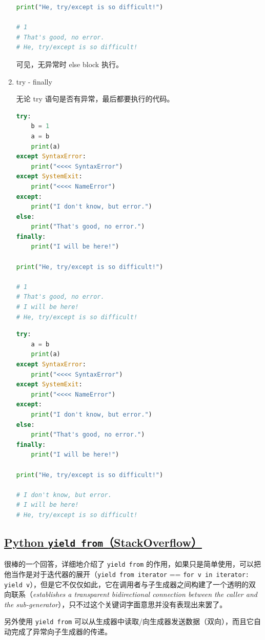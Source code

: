 \begin{enumerate}
\begin{lstlisting}[language=Python]
print("He, try/except is so difficult!")

# 1
# That's good, no error.
# He, try/except is so difficult!
\end{lstlisting}

可见，无异常时 else block 执行。

\item try - finally

无论 try 语句是否有异常，最后都要执行的代码。

\begin{lstlisting}[language=Python]
try:
	b = 1
	a = b
	print(a)
except SyntaxError:
	print("<<<< SyntaxError")
except SystemExit:
	print("<<<< NameError")
except:
	print("I don't know, but error.")
else:
	print("That's good, no error.")
finally:
	print("I will be here!")

print("He, try/except is so difficult!")

# 1
# That's good, no error.
# I will be here!
# He, try/except is so difficult!
\end{lstlisting}

\begin{lstlisting}[language=Python]
try:
	a = b
	print(a)
except SyntaxError:
	print("<<<< SyntaxError")
except SystemExit:
	print("<<<< NameError")
except:
	print("I don't know, but error.")
else:
	print("That's good, no error.")
finally:
	print("I will be here!")

print("He, try/except is so difficult!")

# I don't know, but error.
# I will be here!
# He, try/except is so difficult!
\end{lstlisting}
\end{enumerate}

\subsection{\href{https://stackoverflow.com/a/26109157/7669794}{Python \lstinline{yield from}（StackOverflow）}}

很棒的一个回答，详细地介绍了 \lstinline{yield from} 的作用，如果只是简单使用，可以把他当作是对于迭代器的展开（\lstinline{yield from iterator} == \lstinline{for v in iterator: yield v}），但是它不仅仅如此，它在调用者与子生成器之间构建了一个透明的双向联系（\textit{establishes a transparent bidirectional connection between the caller and the sub-generator}），只不过这个关键词字面意思并没有表现出来罢了。

另外使用 \lstinline{yield from} 可以从生成器中读取/向生成器发送数据（双向），而且它自动完成了异常向子生成器的传递。

